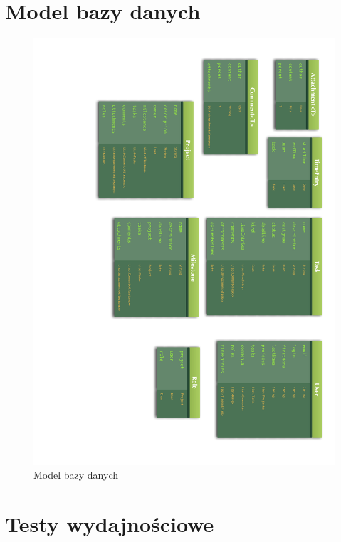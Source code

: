 \documentclass[wide,a4paper,titlepage,12pt] {article}
\begin{document}
  \newpage

  \section{Model bazy danych}
  \begin{figure}[H]
    \begin{center}
      \includegraphics[width=\textwidth]{schemat.pdf}
      \caption{Model bazy danych}
    \end{center}
  \end{figure}

  \newpage

  \section{Testy wydajnościowe}
  \paragraph{}
\end{document}
